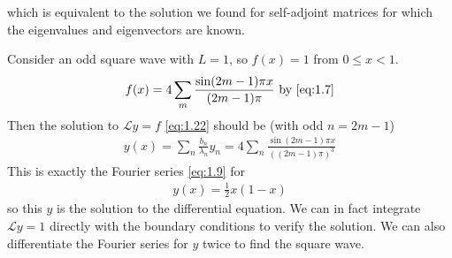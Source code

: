 which is equivalent to the solution we found for self-adjoint matrices for which the eigenvalues and eigenvectors are known.
\begin{example}
    Consider an odd square wave with $L = 1$, so $f(x) = 1$ from $0 \leq x < 1$.
    \begin{align*}
        f(x) = 4 \sum_m \frac{\sin(2m-1)\pi x}{(2m-1)\pi} \text{ by \cref{eq:1.7}}
    \end{align*}
    Then the solution to $\mathcal L y = f$ \cref{eq:1.22} should be (with odd $n = 2m-1$)
    \begin{align*}
        y(x) = \sum_n \frac{b_n}{\lambda_n} y_n = 4 \sum_n \frac{\sin (2m-1) \pi x}{((2m - 1) \pi)^3}
    \end{align*}
    This is exactly the Fourier series \cref{eq:1.9} for
    \begin{align} \label{eq:1.23}
        y(x) = \frac{1}{2}x(1-x) 
    \end{align}
    so this $y$ is the solution to the differential equation.
    We can in fact integrate $\mathcal L y = 1$ directly with the boundary conditions to verify the solution.
    We can also differentiate the Fourier series for $y$ twice to find the square wave.
\end{example}